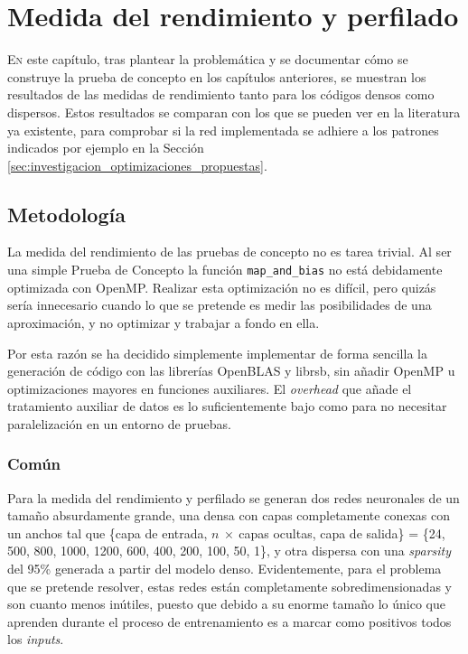 \chapter{Medida del rendimiento y perfilado}
\label{chap:medida_rendimiento_perfilado}

\lettrine{E}{n} este capítulo, tras plantear la problemática y se documentar cómo se construye la prueba de concepto en los capítulos anteriores, se muestran los resultados de las medidas de rendimiento tanto para los códigos densos como dispersos. Estos resultados se comparan con los que se pueden ver en la literatura ya existente, para comprobar si la red implementada se adhiere a los patrones indicados por ejemplo en la Sección \ref{sec:investigacion_optimizaciones_propuestas}.

\section{Metodología}
\label{sec:metodologia}
La medida del rendimiento de las pruebas de concepto no es tarea trivial. Al ser una simple Prueba de Concepto la función \texttt{map\_and\_bias} no está debidamente optimizada con OpenMP. Realizar esta optimización no es difícil, pero quizás sería innecesario cuando lo que se pretende es medir las posibilidades de una aproximación, y no optimizar y trabajar a fondo en ella.

Por esta razón se ha decidido simplemente implementar de forma sencilla la generación de código con las librerías OpenBLAS y librsb, sin añadir OpenMP u optimizaciones mayores en funciones auxiliares. El \textit{overhead} que añade el tratamiento auxiliar de datos es lo suficientemente bajo como para no necesitar paralelización en un entorno de pruebas.

\subsection{Común}
\label{ssec:comun_metodologia}
Para la medida del rendimiento y perfilado se generan dos redes neuronales de un tamaño absurdamente grande, una densa con capas completamente conexas con un anchos tal que \{capa de entrada, $n\:\times\:$capas ocultas, capa de salida\} = \{24, 500, 800, 1000, 1200, 600, 400, 200, 100, 50, 1\}, y otra dispersa con una \textit{sparsity} del 95\% generada a partir del modelo denso. Evidentemente, para el problema que se pretende resolver, estas redes están completamente sobredimensionadas y son cuanto menos inútiles, puesto que debido a su enorme tamaño lo único que aprenden durante el proceso de entrenamiento es a marcar como positivos todos los \textit{inputs}.

